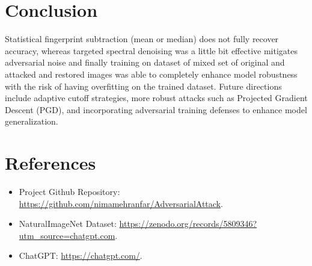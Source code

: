 \documentclass[a4paper,12pt]{report}
\begin{document}
\newpage

\chapter{Conclusion}
Statistical fingerprint subtraction (mean or median) does not fully recover accuracy, whereas targeted spectral denoising  was a little bit effective mitigates adversarial noise and finally training on dataset of mixed set of original and attacked and restored images was able to completely enhance model robustness with the risk of having overfitting on the trained dataset. Future directions include adaptive cutoff strategies, more robust attacks such as Projected Gradient Descent (PGD), and incorporating adversarial training defenses to enhance model generalization.

\newpage

\chapter{References}
\begin{itemize}
    \item Project Github Repository: \url{https://github.com/nimamehranfar/AdversarialAttack}.
    \item NaturalImageNet Dataset: \url{https://zenodo.org/records/5809346?utm_source=chatgpt.com}.
    \item ChatGPT: \url{https://chatgpt.com/}.
\end{itemize}
\end{document}
